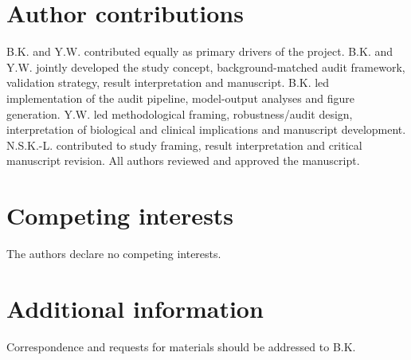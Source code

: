 \documentclass[11pt]{article}
\begin{document}
\section*{Author contributions}

B.K. and Y.W. contributed equally as primary drivers of the project. B.K. and Y.W. jointly developed the study concept, background-matched audit framework, validation strategy, result interpretation and manuscript. B.K. led implementation of the audit pipeline, model-output analyses and figure generation. Y.W. led methodological framing, robustness/audit design, interpretation of biological and clinical implications and manuscript development. N.S.K.-L. contributed to study framing, result interpretation and critical manuscript revision. All authors reviewed and approved the manuscript.

\section*{Competing interests}

The authors declare no competing interests.

\section*{Additional information}

Correspondence and requests for materials should be addressed to B.K.



\end{document}
